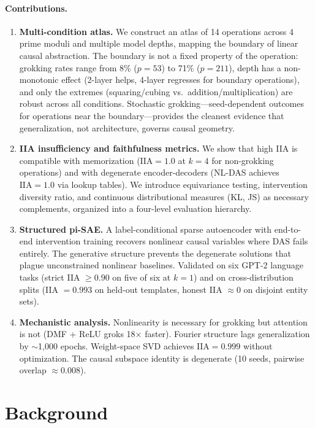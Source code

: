 \documentclass{article}
\newcommand{\IIA}{\mathrm{IIA}}
\begin{document}
\paragraph{Contributions.}
\begin{enumerate}[leftmargin=*]
\item \textbf{Multi-condition atlas.} We construct an atlas of 14 operations
  across 4 prime moduli and multiple model depths,
  mapping the boundary of linear causal abstraction. The boundary is not a
  fixed property of the operation: grokking rates range from 8\% ($p{=}53$)
  to 71\% ($p{=}211$), depth has a non-monotonic effect (2-layer helps,
  4-layer regresses for boundary operations), and only the
  extremes (squaring/cubing vs.\ addition/multiplication) are robust across
  all conditions. Stochastic grokking---seed-dependent outcomes for
  operations near the boundary---provides the cleanest evidence that
  generalization, not architecture, governs causal geometry.
\item \textbf{IIA insufficiency and faithfulness metrics.} We show that
  high IIA is compatible with memorization ($\IIA = 1.0$ at $k{=}4$ for
  non-grokking operations) and with degenerate encoder-decoders (NL-DAS
  achieves $\IIA = 1.0$ via lookup tables). We introduce equivariance
  testing, intervention diversity ratio, and continuous distributional
  measures (KL, JS) as necessary complements, organized into a four-level
  evaluation hierarchy.
\item \textbf{Structured pi-SAE.} A label-conditional sparse autoencoder
  with end-to-end intervention training recovers nonlinear causal
  variables where DAS fails entirely. The generative structure prevents
  the degenerate solutions that plague unconstrained nonlinear baselines.
  Validated on six GPT-2 language tasks (strict IIA $\geq 0.90$ on five
  of six at $k{=}1$) and on cross-distribution splits (IIA $= 0.993$ on
  held-out templates, honest IIA $\approx 0$ on disjoint entity sets).
\item \textbf{Mechanistic analysis.} Nonlinearity is necessary for grokking
  but attention is not (DMF + ReLU groks 18$\times$ faster). Fourier
  structure lags generalization by $\sim$1{,}000 epochs. Weight-space SVD
  achieves $\IIA = 0.999$ without optimization. The causal subspace identity
  is degenerate (10 seeds, pairwise overlap $\approx 0.008$).
\end{enumerate}


\section{Background}
\label{sec:background}
\end{document}

